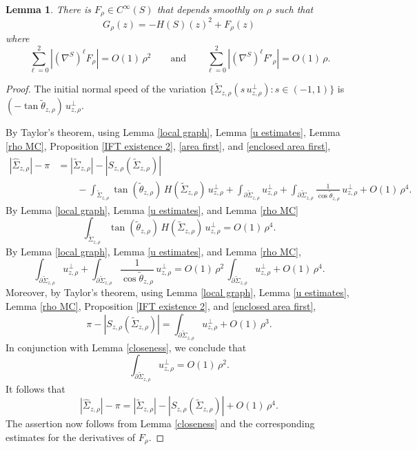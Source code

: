 \documentclass[11pt]{amsart}
\newtheorem{lem}[prop]{Lemma}
\begin{document}
\begin{lem} \label{expansion}
There is $F_\rho \in C^\infty(S)$ that depends smoothly on $\rho$ such that   
$$
G_{\rho}(z)=-H(S)(z)^2+F_\rho(z)
$$
where 
$$
\sum_{\ell=0}^2|(\nabla^S)^\ell F_\rho|=O(1)\,\rho^2\qquad \text{and}\qquad \sum_{\ell=0}^2|(\nabla^S)^\ell F'_\rho|=O(1)\,\rho.
$$

\end{lem}
\begin{proof}
The initial normal speed of the variation $\{\tilde \Sigma_{z,\rho}(s\,u_{z,\rho}^\perp):s\in(-1,1)\}$  is $(-\tan\tilde \theta_{z,\rho})\,u_{z,\rho}^\perp$.
	
By Taylor's theorem, using Lemma \ref{local graph}, Lemma \ref{u estimates}, Lemma \ref{rho MC}, Proposition \ref{IFT existence 2}, \eqref{area first}, and \eqref{enclosed area first}, 
\begin{align*}
	|\hat \Sigma_{z,\rho}|-\pi&=|\tilde \Sigma_{z,\rho}|-|S_{z,\rho}(\tilde \Sigma_{z,\rho})|\\
	&\qquad-\int_{\tilde \Sigma_{z,\rho}}\tan(\tilde\theta_{z,\rho})\,H(\tilde \Sigma_{z,\rho})\,u^\perp_{z,\rho}+\int_{\partial \tilde \Sigma_{z,\rho}}u_{z,\rho}^\perp+\int_{\partial \tilde \Sigma_{z,\rho}}\frac{1}{\cos\tilde \theta_{z,\rho}}\,u^\perp_{z,\rho}+O(1)\,\rho^4.
	\end{align*}
By Lemma \ref{local graph}, Lemma \ref{u estimates}, and Lemma \ref{rho MC}
$$
\int_{\tilde \Sigma_{z,\rho}}\tan(\tilde \theta_{z,\rho})\,H(\tilde \Sigma_{z,\rho})\,u^\perp_{z,\rho}=O(1)\,\rho^4.
$$
By Lemma \ref{local graph}, Lemma \ref{u estimates}, and Lemma \ref{rho MC}, 
$$
\int_{\partial \tilde \Sigma_{z,\rho}}u_{z,\rho}^\perp+\int_{\partial \tilde \Sigma_{z,\rho}}\frac{1}{\cos\tilde \theta_{z,\rho}}\,u^\perp_{z,\rho}=O(1)\,\rho^2\,\int_{\partial \tilde \Sigma_{z,\rho}}u^\perp_{z,\rho}+O(1)\,\rho^4.
$$
Moreover, by Taylor's theorem, using Lemma \ref{local graph}, Lemma \ref{u estimates}, Lemma \ref{rho MC}, Proposition \ref{IFT existence 2},  and \eqref{enclosed area first},
$$
\pi-|S_{z,\rho}(\tilde \Sigma_{z,\rho})|=\int_{\partial \tilde \Sigma_{z,\rho}}u_{z,\rho}^\perp+O(1)\,\rho^3.
$$
In conjunction with Lemma \ref{closeness}, we conclude that
$$
\int_{\partial \tilde \Sigma_{z,\rho}}u_{z,\rho}^\perp=O(1)\,\rho^2.
$$
It follows that 
$$|\hat \Sigma_{z,\rho}|-\pi=|\tilde \Sigma_{z,\rho}|-|S_{z,\rho}(\tilde \Sigma_{z,\rho})|+O(1)\,\rho^4.$$
The assertion now follows from Lemma \ref{closeness} and the corresponding estimates for the derivatives of $F_\rho$.
\end{proof}
\end{document}
